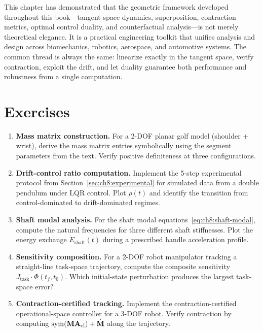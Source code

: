 This chapter has demonstrated that the geometric framework developed throughout this book---tangent-space
dynamics, superposition, contraction metrics, optimal control duality, and counterfactual analysis---is not
merely theoretical elegance. It is a practical engineering toolkit that unifies analysis and design across
biomechanics, robotics, aerospace, and automotive systems. The common thread is always the same: linearize
exactly in the tangent space, verify contraction, exploit the drift, and let duality guarantee both
performance and robustness from a single computation.

\section*{Exercises}

\begin{enumerate}
\item \textbf{Mass matrix construction.}
      For a 2-DOF planar golf model (shoulder + wrist), derive the mass matrix entries
      symbolically using the segment parameters from the text. Verify positive definiteness
      at three configurations.

\item \textbf{Drift-control ratio computation.}
      Implement the 5-step experimental protocol from Section~\ref{sec:ch8:experimental}
      for simulated data from a double pendulum under LQR control. Plot $\rho(t)$ and identify
      the transition from control-dominated to drift-dominated regimes.

\item \textbf{Shaft modal analysis.}
      For the shaft modal equations~\eqref{eq:ch8:shaft-modal}, compute the natural frequencies
      for three different shaft stiffnesses. Plot the energy exchange $\dot{E}_{\text{shaft}}(t)$
      during a prescribed handle acceleration profile.

\item \textbf{Sensitivity composition.}
      For a 2-DOF robot manipulator tracking a straight-line task-space trajectory, compute
      the composite sensitivity $J_{\text{task}} \cdot \Phi(t_f, t_0)$. Which initial-state
      perturbation produces the largest task-space error?

\item \textbf{Contraction-certified tracking.}
      Implement the contraction-certified operational-space controller for a 3-DOF robot.
      Verify contraction by computing $\operatorname{sym}(\mathbf{M}\mathbf{A}_{\text{cl}}) + \dot{\mathbf{M}}$
      along the trajectory.


\end{enumerate}
